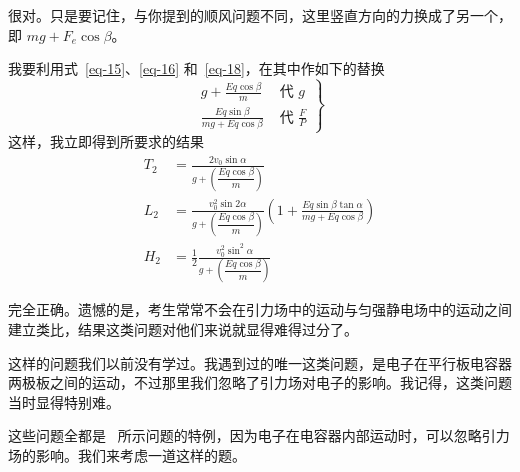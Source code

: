 \begin{dialogue}
\tchr 很对。只是要记住，与你提到的顺风问题不同，这里竖直方向的力换成了另一个，即 $mg + F_{e} \cos \beta$。

\stda 我要利用式~\eqref{eq-15}、\eqref{eq-16} 和~\eqref{eq-18}，在其中作如下的替换
\begin{equation}%
\left.
\begin{aligned}
g + \frac{E q \cos \beta}{m} \,\, & \text{代} \,\, g \\
\frac{E q \sin \beta}{mg + Eq \cos \beta} \,\, & \text{代} \,\, \frac{F}{P}
\label{eq-143}
\end{aligned}
\right\}
\end{equation}
这样，我立即得到所要求的结果
\begin{align}%
T_{2} & = \frac{2 v_{0} \sin \alpha}{ g +  \left(\dfrac{E q \cos \beta}{m} \right)} \label{eq-144}\\
L_{2} &= \frac{ v_{0}^{2} \sin 2 \alpha}{g +  \left(\dfrac{E q \cos \beta}{m} \right)} \left(1 + \frac{Eq \sin \beta \tan \alpha}{mg + Eq \cos \beta} \right) \label{eq-145}\\
H_{2} &=\frac{1}{2} \frac{v_{0}^{2} \sin^{2} \alpha}{g +  \left(\dfrac{E q \cos \beta}{m} \right)} \label{eq-146}
\end{align}

\tchr 完全正确。遗憾的是，考生常常不会在引力场中的运动与匀强静电场中的运动之间建立类比，结果这类问题对他们来说就显得难得过分了。

\stda 这样的问题我们以前没有学过。我遇到过的唯一这类问题，是电子在平行板电容器两极板之间的运动，不过那里我们忽略了引力场对电子的影响。我记得，这类问题当时显得特别难。

\tchr 这些问题全都是~ 所示问题的特例，因为电子在电容器内部运动时，可以忽略引力场的影响。我们来考虑一道这样的题。



\end{dialogue}
